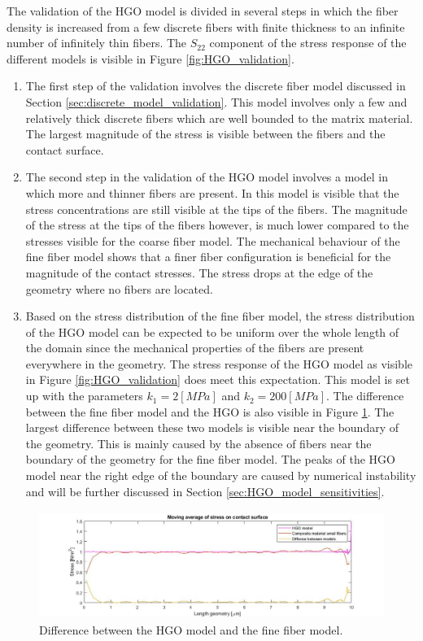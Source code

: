 The validation of the HGO model is divided in several steps in which the fiber density is increased from a few discrete fibers with finite thickness to an infinite number of infinitely thin fibers. The $S_{22}$ component of the stress response of the different models is visible in Figure \ref{fig:HGO_validation}. 
\begin{enumerate}
    \item The first step of the validation involves the discrete fiber model discussed in Section \ref{sec:discrete_model_validation}. This model involves only a few and relatively thick discrete fibers which are well bounded to the matrix material. The largest magnitude of the stress is visible between the fibers and the contact surface.
    \item The second step in the validation of the HGO model involves a model in which more and thinner fibers are present. In this model is visible that the stress concentrations are still visible at the tips of the fibers. The magnitude of the stress at the tips of the fibers however, is much lower compared to the stresses visible for the coarse fiber model. The mechanical behaviour of the fine fiber model shows that a finer fiber configuration is beneficial for the magnitude of the contact stresses. The stress drops at the edge of the geometry where no fibers are located. 
    \item Based on the stress distribution of the fine fiber model, the stress distribution of the HGO model can be expected to be uniform over the whole length of the domain since the mechanical properties of the fibers are present everywhere in the geometry. The stress response of the HGO model as visible in Figure \ref{fig:HGO_validation} does meet this expectation. This model is set up
    with the parameters $k_{1} = 2 [MPa]$ and $k_{2} = 200 [MPa]$. The difference between the fine fiber model and the HGO is also visible in Figure \ref{fig:HGO_fine_fibers_val}. The largest difference between these two models is visible near the boundary of the geometry. This is mainly caused by the absence of fibers near the boundary of the geometry for the fine fiber model. The peaks of the HGO model near the right edge of the boundary are caused by numerical instability and will be further discussed in Section \ref{sec:HGO_model_sensitivities}. 
\end{enumerate}

\begin{figure}[h!]
\includegraphics[width=0.6\linewidth, height=3.5cm, angle=0]{images/HGO_model_validation/validatie_HGO_en_fine_fibers.jpg}
\caption{Difference between the HGO model and the fine fiber model.}
\label{fig:HGO_fine_fibers_val}
\end{figure}

